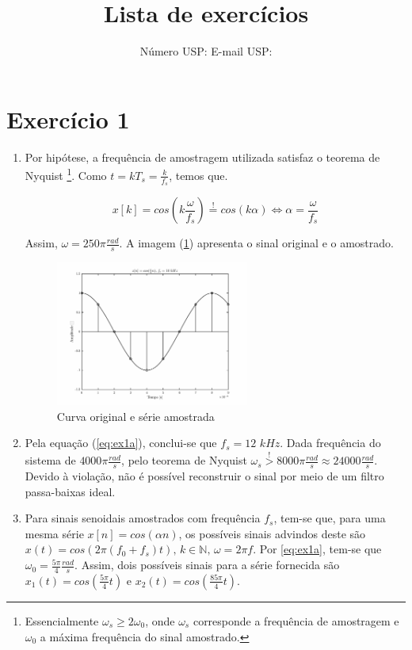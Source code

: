\documentclass{article}
\title{Lista de exercícios \esnumber}
\author{\studentname \qquad Número USP: \uspid \qquad E-mail USP: \uspmail}
\begin{document}
\maketitle

\section*{Exercício 1}
\begin{enumerate}
\item %

Por hipótese, a frequência de amostragem utilizada satisfaz o teorema de Nyquist \footnote{Essencialmente $\omega_s \geq 2\omega_0$, onde $\omega_s$ corresponde a frequência de amostragem e $\omega_0$ a máxima frequência do sinal amostrado.}. Como $t = kT_s = \frac{k}{f_s}$, temos que.

\begin{equation}
\label{eq:ex1a}
x[k] = cos(k \frac{\omega}{f_s})  \stackrel{!}{=} cos(k \alpha) \Longleftrightarrow \alpha = \frac{\omega}{f_s}
\end{equation}

Assim, $\omega = 250\pi \frac{rad}{s}$. A imagem (\ref{fig:ex1}) apresenta o sinal original e o amostrado.

\begin{figure}[!h]
	\center
	\includegraphics[width=0.6\textwidth]{./images/ex1a.eps}
	\caption{Curva original e série amostrada}
	\label{fig:ex1}
\end{figure}

\item %
Pela equação (\ref{eq:ex1a}), conclui-se que $f_s = 12$ $kHz$. Dada frequência do sistema de $4000\pi \frac{rad}{s}$, pelo teorema de Nyquist $\omega_s \stackrel{!}{>} 8000\pi \frac{rad}{s} \approx 24000 \frac{rad}{s}$. Devido à violação, não é possível reconstruir o sinal por meio de um filtro passa-baixas ideal. 

\item %
Para sinais senoidais amostrados com frequência $f_s$, tem-se que, para uma mesma série $x[n] = cos(\alpha n)$, os possíveis sinais advindos deste são $x(t) = cos(2 \pi (f_0 + f_s)t) \mbox{, } k \in \mathbb{N} \mbox{, } \omega = 2 \pi f$. Por \ref{eq:ex1a}, tem-se que $\omega_0 = \frac{5\pi}{4} \frac{rad}{s}$. Assim, dois possíveis sinais para a série fornecida são $x_1(t) = cos(\frac{5\pi}{4} t )$ e $x_2(t) = cos(\frac{85\pi}{4} t)$.


\end{enumerate}
\end{document}
